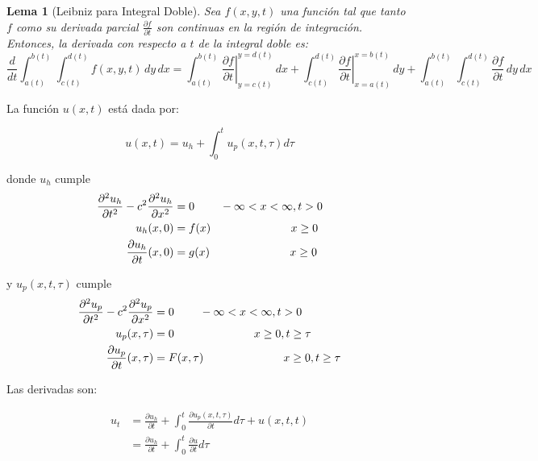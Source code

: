 \documentclass[11pt]{book}
\theoremstyle{plain}
\newtheorem{lema}[proposición]{Lema}
\theoremstyle{definition}
\begin{document}
\begin{lema}[Leibniz para Integral Doble]
Sea \( f(x, y, t) \) una función tal que tanto \( f \) como su derivada parcial \( \frac{\partial f}{\partial t} \) son continuas en la región de integración. Entonces, la derivada con respecto a \( t \) de la integral doble es:
\[
\frac{d}{dt} \int_{a(t)}^{b(t)} \int_{c(t)}^{d(t)} f(x, y, t) \, dy \, dx = 
\int_{a(t)}^{b(t)} \left. \frac{\partial f}{\partial t} \right|_{y=c(t)}^{y=d(t)} \, dx 
+ \int_{c(t)}^{d(t)} \left. \frac{\partial f}{\partial t} \right|_{x=a(t)}^{x=b(t)} \, dy 
+ \int_{a(t)}^{b(t)} \int_{c(t)}^{d(t)} \frac{\partial f}{\partial t} \, dy \, dx
\]
\end{lema}
La función \( u(x, t) \) está dada por:

\[
u(x,t) = u_{h} + \int_{0}^{t} u_{p}(x,t,\tau) d\tau
\]

donde $u_{h}$ cumple
\begin{align*}
    \frac{\partial^2 u_{h}}{\partial t^2} - c^2 \frac{\partial^2 u_{h}}{\partial x^2}&= 0 \hspace{8mm} -\infty<x<\infty, t > 0\\ 
    u_{h}(x,0)&= f(x) \hspace{25mm} x \geq 0\\
    \frac{\partial u_{h}}{\partial t}(x,0) &= g(x) \hspace{25mm} x \geq 0
\end{align*}

y $u_{p}(x,t,\tau)$ cumple
\begin{align*}
    \frac{\partial^2 u_{p}}{\partial t^2} - c^2 \frac{\partial^2 u_{p}}{\partial x^2}&= 0 \hspace{8mm} -\infty<x<\infty, t > 0\\ 
    u_{p}(x,\tau)&= 0 \hspace{25mm} x \geq 0, t\geq \tau\\
    \frac{\partial u_{p}}{\partial t}(x,\tau) &= F(x,\tau) \hspace{25mm} x \geq 0, t\geq \tau
\end{align*}

Las derivadas son:

\begin{align*}
u_{t} &= \frac{\partial u_{h}}{\partial t} + \int_{0}^{t} \frac{\partial u_{p}(x,t,\tau)}{\partial t} d\tau + u(x,t,t)\\
&= \frac{\partial u_{h}}{\partial t} + \int_{0}^{t} \frac{\partial u}{\partial t} d\tau
\end{align*}
\end{document}

